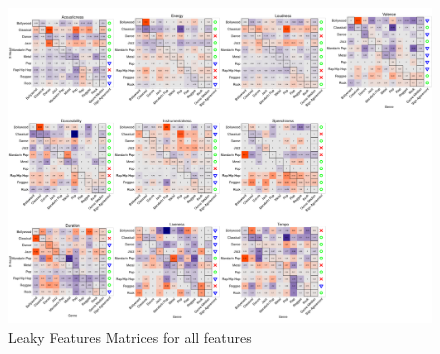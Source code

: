 \documentclass[a4paper]{article}
\begin{document}
\begin{figure}
\includegraphics[width=\linewidth]{leakySupplemental}
\caption[Leaky Supplemental]{Leaky Features Matrices for all features}
\end{figure}
\end{document}
